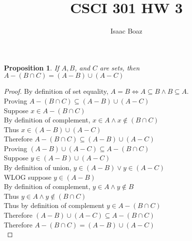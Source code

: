 \documentclass{article}
\title{\vspace{-5ex}CSCI 301 HW 3}
\author{Isaac Boaz}
\newtheorem*{theorem}{Proposition}
\begin{document}
\maketitle

\begin{theorem}
    If \(A, B\), and \(C\) are sets, then \(A- (B \cap C) = (A - B) \cup (A - C)\)
\end{theorem}

\begin{proof}
    By definition of set equality, \(A = B \iff A \subseteq B \land B \subseteq A\). \\
    Proving \(A-(B \cap C) \subseteq (A-B) \cup (A - C)\) \\
    Suppose \(x \in A-(B \cap C)\) \\
    By definition of complement, \(x \in A \land x \notin (B \cap C)\) \\
    Thus \(x \in (A-B) \cup (A - C)\) \\
    Therefore \(A-(B \cap C) \subseteq (A-B) \cup (A - C)\) \\

    \noindent
    Proving \((A-B) \cup (A - C) \subseteq A-(B \cap C)\) \\
    Suppose \(y \in (A-B) \cup (A - C)\) \\
    By definition of union, \(y \in (A-B) \lor y \in (A - C)\) \\
    WLOG suppose \(y \in (A-B)\) \\
    By definition of complement, \(y \in A \land y \notin B\) \\
    Thus \(y \in A \land y \notin (B \cap C)\) \\
    Thus by definition of complement \(y \in A-(B \cap C)\) \\
    Therefore \((A-B) \cup (A - C) \subseteq A-(B \cap C)\) \\

    \noindent
    Therefore \(A-(B \cap C) = (A-B) \cup (A - C)\) \\
\end{proof}
\end{document}
